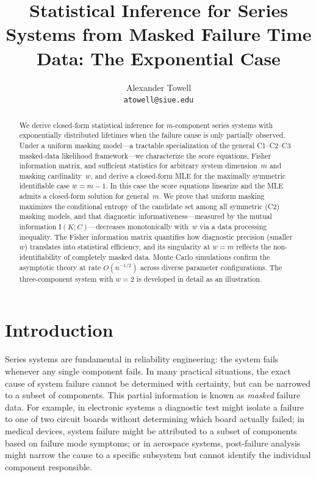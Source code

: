 \documentclass[12pt]{article}
\title{Statistical Inference for Series Systems from Masked Failure Time Data: The Exponential Case}
\author{Alexander Towell\\\texttt{atowell@siue.edu}}
\date{}
\theoremstyle{definition}
\theoremstyle{remark}
\begin{document}
\maketitle

\begin{abstract}
We derive closed-form statistical inference for $m$-component series systems with exponentially distributed lifetimes when the failure cause is only partially observed. Under a uniform masking model---a tractable specialization of the general C1--C2--C3 masked-data likelihood framework---we characterize the score equations, Fisher information matrix, and sufficient statistics for arbitrary system dimension~$m$ and masking cardinality~$w$, and derive a closed-form MLE for the maximally symmetric identifiable case $w = m-1$. In this case the score equations linearize and the MLE admits a closed-form solution for general~$m$. We prove that uniform masking maximizes the conditional entropy of the candidate set among all symmetric (C2) masking models, and that diagnostic informativeness---measured by the mutual information $\mathrm{I}(K; C)$---decreases monotonically with~$w$ via a data processing inequality. The Fisher information matrix quantifies how diagnostic precision (smaller~$w$) translates into statistical efficiency, and its singularity at $w = m$ reflects the non-identifiability of completely masked data. Monte Carlo simulations confirm the asymptotic theory at rate $O(n^{-1/2})$ across diverse parameter configurations. The three-component system with $w = 2$ is developed in detail as an illustration.
\end{abstract}

\tableofcontents

\section{Introduction}
\label{sec:intro}

Series systems are fundamental in reliability engineering: the system fails whenever any single component fails. In many practical situations, the exact cause of system failure cannot be determined with certainty, but can be narrowed to a subset of components. This partial information is known as \emph{masked} failure data. For example, in electronic systems a diagnostic test might isolate a failure to one of two circuit boards without determining which board actually failed; in medical devices, system failure might be attributed to a subset of components based on failure mode symptoms; or in aerospace systems, post-failure analysis might narrow the cause to a specific subsystem but cannot identify the individual component responsible.
\end{document}
